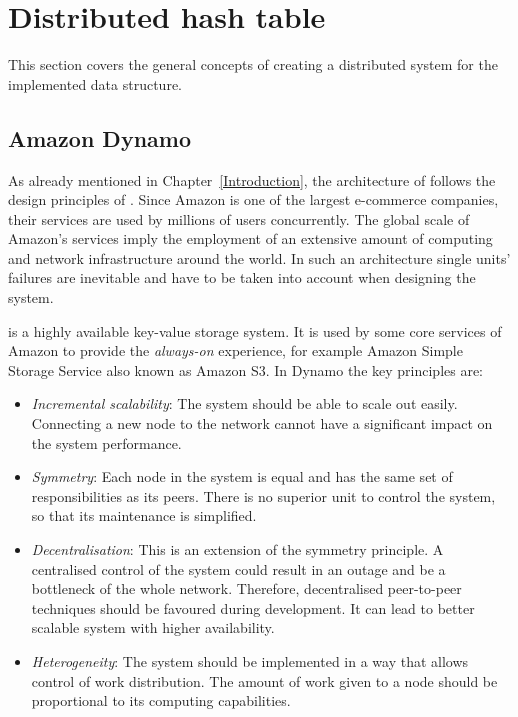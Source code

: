     
\section{Distributed hash table} %

    This section covers the general concepts of creating a distributed system for the implemented data structure. 

    \subsection{Amazon Dynamo}
        As already mentioned in Chapter~\ref{Introduction}, the architecture of \DHTS follows the design principles of \Dynamo. 
        Since Amazon is one of the largest e-commerce companies, their services are used by millions of users concurrently.
        The global scale of Amazon's services imply the employment of an extensive amount of computing and network infrastructure around the world.
        In such an architecture single units' failures are inevitable and have to be taken into account when designing the system.
        
        \Dynamo is a highly available key-value storage system.
        It is used by some core services of Amazon to provide the \emph{always-on} experience, for example Amazon Simple Storage Service \cite{AmazonS3} also known as Amazon S3.
        In Dynamo the key principles are:
        
        \begin{itemize}
            \item \textit{Incremental scalability}:
                The system should be able to scale out easily.
                Connecting a new node to the network cannot have a significant impact on the system performance.
            \item \textit{Symmetry}:
                Each node in the system is equal and has the same set of responsibilities as its peers. 
                There is no superior unit to control the system, so that its maintenance is simplified.
            \item \textit{Decentralisation}:
                This is an extension of the symmetry principle.
                A centralised control of the system could result in an outage and be a bottleneck of the whole network.
                Therefore, decentralised peer-to-peer techniques should be favoured during development.
                It can lead to better scalable system with higher availability.
            \item \textit{Heterogeneity}:
                The system should be implemented in a way that allows control of work distribution. 
                The amount of work given to a node should be proportional to its computing capabilities.
        \end{itemize}

